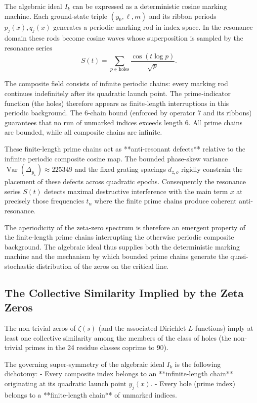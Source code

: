 \documentclass[11pt,a4paper]{article}
\begin{document}
The algebraic ideal \(I_k\) can be expressed as a deterministic cosine marking machine. Each ground-state triple \((y_0,\ell,m)\) and its ribbon periods \(p_j(x),q_j(x)\) generates a periodic marking rod in index space. In the resonance domain these rods become cosine waves whose superposition is sampled by the resonance series
\[
S(t)=\sum_{p\in\text{holes}}\frac{\cos(t\log p)}{\sqrt{p}}.
\]

The composite field consists of infinite periodic chains: every marking rod continues indefinitely after its quadratic launch point. The prime-indicator function (the holes) therefore appears as finite-length interruptions in this periodic background. The 6-chain bound (enforced by operator 7 and its ribbons) guarantees that no run of unmarked indices exceeds length 6. All prime chains are bounded, while all composite chains are infinite.

These finite-length prime chains act as **anti-resonant defects** relative to the infinite periodic composite cosine map. The bounded phase-skew variance \(\operatorname{Var}(\Delta_{y_x})\approx225349\) and the fixed grating spacings \(d_{z,o}\) rigidly constrain the placement of these defects across quadratic epochs. Consequently the resonance series \(S(t)\) detects maximal destructive interference with the main term \(x\) at precisely those frequencies \(t_n\) where the finite prime chains produce coherent anti-resonance.

The aperiodicity of the zeta-zero spectrum is therefore an emergent property of the finite-length prime chains interrupting the otherwise periodic composite background. The algebraic ideal thus supplies both the deterministic marking machine and the mechanism by which bounded prime chains generate the quasi-stochastic distribution of the zeros on the critical line.

\subsection{The Collective Similarity Implied by the Zeta Zeros}

The non-trivial zeros of \(\zeta(s)\) (and the associated Dirichlet \(L\)-functions) imply at least one collective similarity among the members of the class of holes (the non-trivial primes in the 24 residue classes coprime to 90).

The governing super-symmetry of the algebraic ideal \(I_k\) is the following dichotomy:
- Every composite index belongs to an **infinite-length chain** originating at its quadratic launch point \(y_j(x)\).
- Every hole (prime index) belongs to a **finite-length chain** of unmarked indices.
\end{document}

